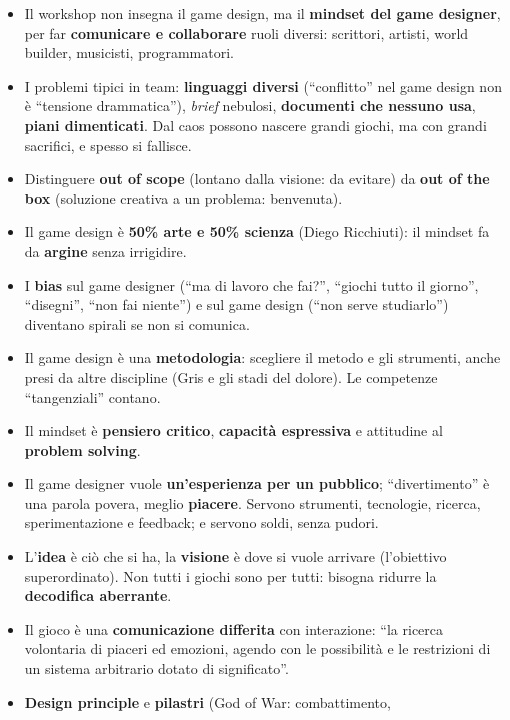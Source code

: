 \begin{itemize}
  \item Il workshop non insegna il game design, ma il \textbf{mindset del game
        designer}, per far \textbf{comunicare e collaborare} ruoli diversi:
        scrittori, artisti, world builder, musicisti, programmatori.
  \item I problemi tipici in team: \textbf{linguaggi diversi} (``conflitto'' nel
        game design non è ``tensione drammatica''), \emph{brief} nebulosi,
        \textbf{documenti che nessuno usa}, \textbf{piani dimenticati}. Dal caos
        possono nascere grandi giochi, ma con grandi sacrifici, e spesso si
        fallisce.
  \item Distinguere \textbf{out of scope} (lontano dalla visione: da evitare) da
        \textbf{out of the box} (soluzione creativa a un problema: benvenuta).
  \item Il game design è \textbf{50\% arte e 50\% scienza} (Diego Ricchiuti): il
        mindset fa da \textbf{argine} senza irrigidire.
  \item I \textbf{bias} sul game designer (``ma di lavoro che fai?'', ``giochi
        tutto il giorno'', ``disegni'', ``non fai niente'') e sul game design
        (``non serve studiarlo'') diventano spirali se non si comunica.
  \item Il game design è una \textbf{metodologia}: scegliere il metodo e gli
        strumenti, anche presi da altre discipline (Gris e gli stadi del
        dolore). Le competenze ``tangenziali'' contano.
  \item Il mindset è \textbf{pensiero critico}, \textbf{capacità espressiva} e
        attitudine al \textbf{problem solving}.
  \item Il game designer vuole \textbf{un'esperienza per un pubblico};
        ``divertimento'' è una parola povera, meglio \textbf{piacere}. Servono
        strumenti, tecnologie, ricerca, sperimentazione e feedback; e servono
        soldi, senza pudori.
  \item L'\textbf{idea} è ciò che si ha, la \textbf{visione} è dove si vuole
        arrivare (l'obiettivo superordinato). Non tutti i giochi sono per tutti:
        bisogna ridurre la \textbf{decodifica aberrante}.
  \item Il gioco è una \textbf{comunicazione differita} con interazione: ``la
        ricerca volontaria di piaceri ed emozioni, agendo con le possibilità e le
        restrizioni di un sistema arbitrario dotato di significato''.
  \item \textbf{Design principle} e \textbf{pilastri} (God of War: combattimento,

\end{itemize}
